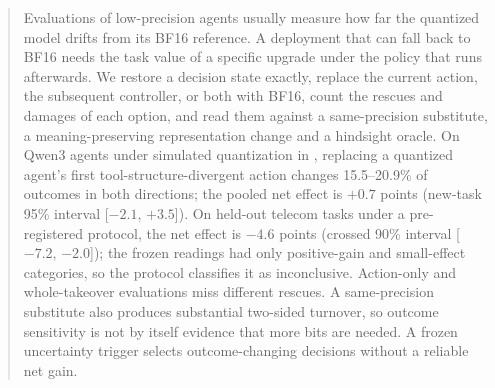 \begin{abstract}
Evaluations of low-precision agents usually measure how far the quantized model drifts from its BF16 reference. A deployment that can fall back to BF16 needs the task value of a specific upgrade under the policy that runs afterwards. We restore a decision state exactly, replace the current action, the subsequent controller, or both with BF16, count the rescues and damages of each option, and read them against a same-precision substitute, a meaning-preserving representation change and a hindsight oracle. On Qwen3 agents under simulated quantization in \tautwo{}, replacing a quantized agent's first tool-structure-divergent action changes 15.5--20.9\% of outcomes in both directions; the pooled net effect is $+0.7$ points (new-task 95\% interval [$-2.1$, $+3.5$]). On held-out telecom tasks under a pre-registered protocol, the net effect is $-4.6$ points (crossed 90\% interval [$-7.2$, $-2.0$]); the frozen readings had only positive-gain and small-effect categories, so the protocol classifies it as inconclusive. Action-only and whole-takeover evaluations miss different rescues. A same-precision substitute also produces substantial two-sided turnover, so outcome sensitivity is not by itself evidence that more bits are needed. A frozen uncertainty trigger selects outcome-changing decisions without a reliable net gain. %
\end{abstract}
